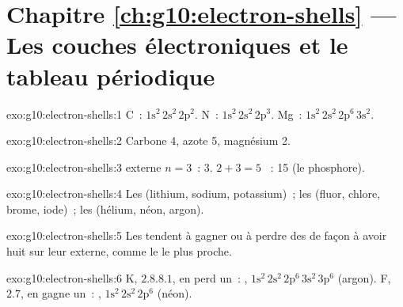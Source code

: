 \section*{Chapitre \ref{ch:g10:electron-shells} --- Les couches électroniques et le tableau périodique}

\begin{solution}{exo:g10:electron-shells:1}
C~: $1\mathrm{s}^2\,2\mathrm{s}^2\,2\mathrm{p}^2$. N~:
$1\mathrm{s}^2\,2\mathrm{s}^2\,2\mathrm{p}^3$. Mg~:
$1\mathrm{s}^2\,2\mathrm{s}^2\,2\mathrm{p}^6\,3\mathrm{s}^2$.
\end{solution}

\begin{solution}{exo:g10:electron-shells:2}
Carbone 4, azote 5, magnésium 2.
\end{solution}

\begin{solution}{exo:g10:electron-shells:3}
 externe $n = 3$~:  3. $2 + 3 = 5$ ~:
 15 (le phosphore).
\end{solution}

\begin{solution}{exo:g10:electron-shells:4}
Les  (lithium, sodium, potassium)~; les 
(fluor, chlore, brome, iode)~; les  (hélium, néon, argon).
\end{solution}

\begin{solution}{exo:g10:electron-shells:5}
Les  tendent à gagner ou à perdre des  de façon à avoir
huit  sur leur  externe, comme le  le plus
proche.
\end{solution}

\begin{solution}{exo:g10:electron-shells:6}
K, $2.8.8.1$, en perd un~: ,
$1\mathrm{s}^2\,2\mathrm{s}^2\,2\mathrm{p}^6\,3\mathrm{s}^2\,3\mathrm{p}^6$
(argon). F, $2.7$, en gagne un~: ,
$1\mathrm{s}^2\,2\mathrm{s}^2\,2\mathrm{p}^6$ (néon).
\end{solution}

